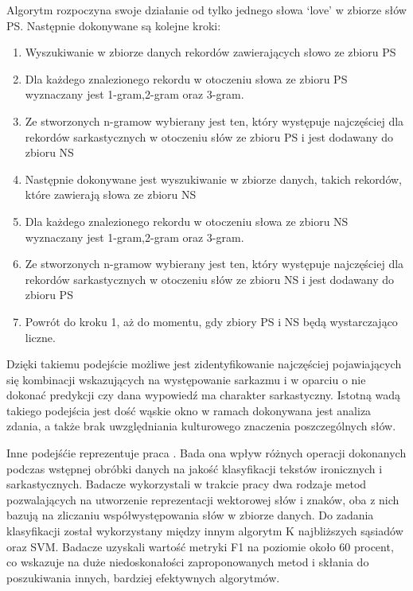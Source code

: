 \noindent Algorytm rozpoczyna swoje działanie od tylko jednego słowa ‘love’ w zbiorze słów PS. Następnie dokonywane są kolejne kroki:
\begin{enumerate}
    \item Wyszukiwanie w zbiorze danych rekordów zawierających słowo ze zbioru PS
    \item Dla każdego znalezionego rekordu w otoczeniu słowa ze zbioru PS wyznaczany jest 1-gram,2-gram oraz 3-gram.
    \item Ze stworzonych n-gramow wybierany jest ten, który występuje najczęściej dla rekordów sarkastycznych w otoczeniu słów ze zbioru PS i jest dodawany do zbioru NS
    \item Następnie dokonywane jest wyszukiwanie w zbiorze danych, takich rekordów, które zawierają słowa ze zbioru NS
    \item Dla każdego znalezionego rekordu w otoczeniu słowa ze zbioru NS wyznaczany jest 1-gram,2-gram oraz 3-gram.
    \item Ze stworzonych n-gramow wybierany jest ten, który występuje najczęściej dla rekordów sarkastycznych w otoczeniu słów ze zbioru NS i jest dodawany do zbioru PS
    \item Powrót do kroku 1, aż do momentu, gdy zbiory PS i NS będą wystarczająco liczne.
\end{enumerate}

\hfill 


\noindent Dzięki takiemu podejście możliwe jest zidentyfikowanie najczęściej pojawiających się kombinacji wskazujących na występowanie sarkazmu i w oparciu o nie dokonać predykcji czy dana wypowiedź ma charakter sarkastyczny. Istotną wadą takiego podejścia jest dość wąskie okno w ramach dokonywana jest analiza zdania, a także brak uwzględniania kulturowego znaczenia poszczególnych słów.

Inne podejśćie reprezentuje praca \cite{one_more_source_to_lit}. Bada ona wpływ różnych operacji dokonanych podczas wstępnej obróbki danych na jakość klasyfikacji tekstów ironicznych i sarkastycznych. Badacze wykorzystali w trakcie pracy dwa rodzaje metod pozwalających na utworzenie reprezentacji wektorowej słów i znaków, oba z nich bazują na zliczaniu współwystępowania słów w zbiorze danych. Do zadania klasyfikacji został wykorzystany między innym algorytm K najbliższych sąsiadów oraz SVM. Badacze uzyskali wartość metryki F1 na poziomie około 60 procent, co wskazuje na duże niedoskonałości zaproponowanych metod i skłania do poszukiwania innych, bardziej efektywnych algorytmów. 

